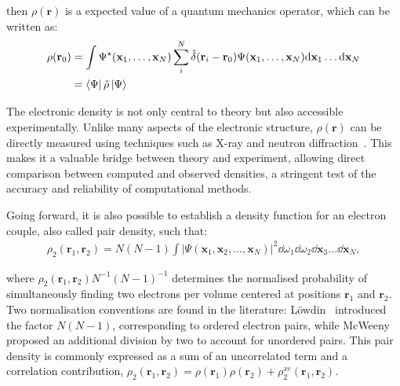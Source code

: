 \noindent then $\rho (\mathbf{r})$ is a expected value of a quantum mechanics
operator, which can be written as:
%
\begin{align}
  \rho (\mathbf{r}_0) &= \int\Psi^{\star} (\mathbf{x}_1, \ldots , \mathbf{x}_N)
  \sum_i^N \hat{\delta} (\mathbf{r}_i - \mathbf{r}_0) \Psi (\mathbf{x}_1, \ldots , \mathbf{x}_N)
  \dd\mathbf{x}_1 \ldots \dd\mathbf{x}_N \nonumber \\
  & = \bra{\Psi} \hat{\rho} \ket{\Psi} 
\end{align}

The electronic density is not only central to theory but also accessible
experimentally. Unlike many aspects of the electronic structure,
$\rho(\mathbf{r})$ can be directly measured using techniques such as X-ray and
neutron diffraction~\cite{Kasai2018, Coppens1971}. This makes it a valuable
bridge between theory and experiment, allowing direct comparison between
computed and observed densities, a stringent test of the accuracy and
reliability of computational methods.

Going forward, it is also possible to establish a density function for an electron
couple, also called pair density, such that:
%
\begin{align}
  \rho_2(\mathbf{r}_1,\mathbf{r}_2) = N(N-1)\int |\Psi(\mathbf{x}_1, \mathbf{x}_2, \ldots , \mathbf{x}_N)|^2
  \dd\omega_1 \dd\omega_2  \dd\mathbf{x}_3 \ldots \dd\mathbf{x}_N ,
  \label{d_pares}
\end{align}

\noindent where $\rho_2(\mathbf{r}_1,\mathbf{r}_2)N^{-1}(N-1)^{-1}$ determines
the normalised probability of simultaneously finding two electrons per volume
centered at positions $\mathbf{r}_1$ and $\mathbf{r}_2$.  Two normalisation
conventions are found in the literature: Löwdin~\cite{Lwdin1955} introduced the
factor $N(N-1)$, corresponding to ordered electron pairs, while
McWeeny~\cite{mcweeny1969methods} proposed an additional division by two to
account for unordered pairs. This pair density is commonly expressed as a sum
of an uncorrelated term and a correlation contribution, $\rho_2(\mathbf{r}_1,
\mathbf{r}_2) = \rho(\mathbf{r}_1)\rho(\mathbf{r}_2) +
\rho_2^{xc}(\mathbf{r}_1, \mathbf{r}_2)$.

